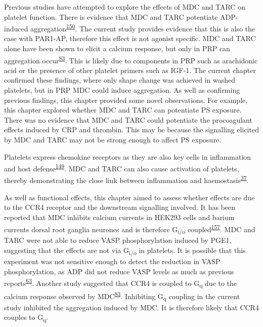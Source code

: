 \documentclass[11pt,twoside]{bristolthesis}
\begin{document}
Previous studies have attempted to explore the effects of MDC and TARC on platelet function. There is evidence that MDC and TARC potentiate ADP-induced aggregation\textsuperscript{\protect\hyperlink{ref-Gear2001}{150}}. The current study provides evidence that this is also the case with PAR1-AP, therefore this effect is not agonist specific. MDC and TARC alone have been shown to elicit a calcium response, but only in PRP can aggregation occur\textsuperscript{\protect\hyperlink{ref-Kowalska2000}{83}}. This is likely due to components in PRP such as arachidonic acid or the presence of other platelet primers such as IGF-1. The current chapter confirmed these findings, where only shape change was achieved in washed platelets, but in PRP MDC could induce aggregation. As well as confirming previous findings, this chapter provided some novel observations. For example, this chapter explored whether MDC and TARC can potentiate PS exposure. There was no evidence that MDC and TARC could potentiate the procoagulant effects induced by CRP and thrombin. This may be because the signalling elicited by MDC and TARC may not be strong enough to affect PS exposure.

Platelets express chemokine receptors as they are also key cells in inflammation and host defense\textsuperscript{\protect\hyperlink{ref-Clemetson2000}{149}}. MDC and TARC can also cause activation of platelets, thereby demonstrating the close link between inflammation and haemostasis\textsuperscript{\protect\hyperlink{ref-Gear2003}{37}}.

As well as functional effects, this chapter aimed to assess whether effects are due to the CCR4 receptor and the downstream signalling involved. It has been reported that MDC inhibits calcium currents in HEK293 cells and barium currents dorsal root ganglia neurones and is therefore G\textsubscript{i/o} coupled\textsuperscript{\protect\hyperlink{ref-Oh2002}{157}}. MDC and TARC were not able to reduce VASP phosphorylation induced by PGE1, suggesting that the effects are not via G\textsubscript{i/o} in platelets. It is possible that this experiment was not sensitive enough to detect the reduction in VASP phosphorylation, as ADP did not reduce VASP levels as much as previous reports\textsuperscript{\protect\hyperlink{ref-Hezard2005}{63}}. Another study suggested that CCR4 is coupled to G\textsubscript{q} due to the calcium response observed by MDC\textsuperscript{\protect\hyperlink{ref-Kowalska2000}{83}}. Inhibiting G\textsubscript{q} coupling in the current study inhibited the aggregation induced by MDC. It is therefore likely that CCR4 couples to G\textsubscript{q}.
\end{document}

